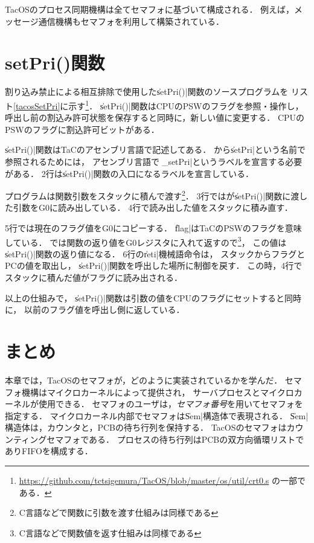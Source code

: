 TacOSのプロセス同期機構は全てセマフォに基づいて構成される．
例えば，メッセージ通信機構もセマフォを利用して構築されている．

\section{setPri()関数}
\label{setPri}
割り込み禁止による相互排除で使用した\|setPri()|関数のソースプログラムを
リスト\ref{tacosSetPri}に示す\footnote{
  \url{https://github.com/tctsigemura/TacOS/blob/master/os/util/crt0.s}
  の一部である．}．
\|setPri()|関数はCPUのPSWのフラグを参照・操作し，
呼出し前の割込み許可状態を保存すると同時に，新しい値に変更する．
CPUのPSWのフラグに割込許可ビットがある．



\|setPri()|関数はTaCのアセンブリ言語で記述してある．
{\cmml}から\|setPri|という名前で参照されるためには，
アセンブリ言語では\|_setPri|というラベルを宣言する必要がある．
2行は\|setPri()|関数の入口になるラベルを宣言している．

{\cmml}プログラムは関数引数をスタックに積んで渡す\footnote{
  C言語などで関数に引数を渡す仕組みは同様である}．
3行では{\cmml}が\|setPri()|関数に渡した引数をG0に読み出している．
4行で読み出した値をスタックに積み直す．

5行では現在のフラグ値をG0にコピーする．
\|flag|はTaCのPSWのフラグを意味している．
{\cmml}では関数の返り値をG0レジスタに入れて返すので\footnote{
  C言語などで関数値を返す仕組みは同様である}，
この値は\|setPri()|関数の返り値になる．
6行の\|reti|機械語命令は，
スタックからフラグとPCの値を取出し，
\|setPri()|関数を呼出した場所に制御を戻す．
この時，4行でスタックに積んだ値がフラグに読み出される．

以上の仕組みで，
\|setPri()|関数は引数の値をCPUのフラグにセットすると同時に，
以前のフラグ値を呼出し側に返している．


\section{まとめ}
本章では，TacOSのセマフォが，どのように実装されているかを学んだ．
セマフォ機構はマイクロカーネルによって提供され，
サーバプロセスとマイクロカーネルが使用できる．
セマフォのユーザは，\emph{セマフォ番号}を用いてセマフォを指定する．
マイクロカーネル内部でセマフォは\|Sem|構造体で表現される．
\|Sem|構造体は，カウンタと，PCBの待ち行列を保持する．
TacOSのセマフォはカウンティングセマフォである．
プロセスの待ち行列はPCBの双方向循環リストでありFIFOを構成する．

